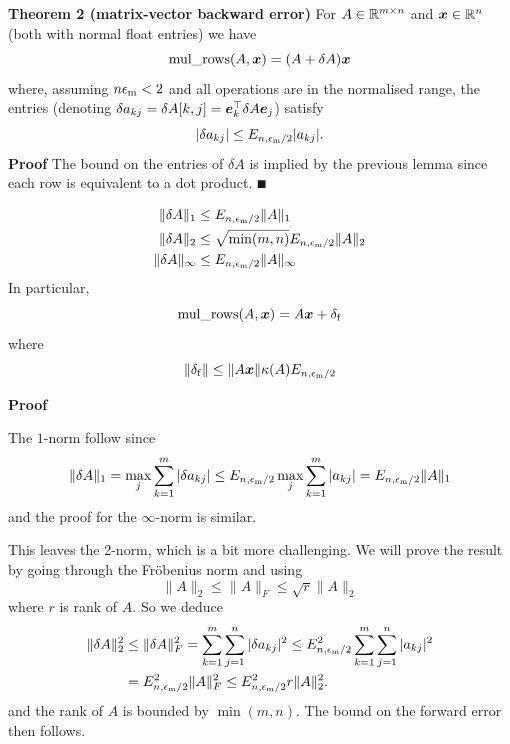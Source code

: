 \textbf{Theorem 2 (matrix-vector backward error)} For $A \in {\mathbb R}^{m \times n}$ and $\bm{{\mbox{\boldmath$x$\unboldmath}}} \in {\mathbb R}^n$ (both with normal float entries) we have
\[
\hbox{mul$\_$rows}(A, \bm{{\mbox{\boldmath$x$\unboldmath}}}) = (A + \delta A) \bm{{\mbox{\boldmath$x$\unboldmath}}}
\]
where, assuming $n \ensuremath{\epsilon}_{\rm m} < 2$ and all operations are in the normalised range, the entries (denoting $\delta a_{kj} = \delta A[k,j] = \bm{{\mbox{\boldmath$e$\unboldmath}}}_k^\top \delta A \bm{{\mbox{\boldmath$e$\unboldmath}}}_j$) satisfy
\[
|\ensuremath{\delta}a_{kj}| \ensuremath{\leq} E_{n,\ensuremath{\epsilon}_{\rm m}/2}  |a_{kj}|.
\]
\textbf{Proof} The bound on the entries of $\ensuremath{\delta}A$ is implied by the previous lemma since each row is equivalent to a dot product. \ensuremath{\QED}

\begin{corollary}[Norms]
\begin{align*}
\|\ensuremath{\delta}A\|_1 &\ensuremath{\leq} E_{n,\ensuremath{\epsilon}_{\rm m}/2} \|A \|_1 \\
\|\ensuremath{\delta}A\|_2 &\ensuremath{\leq} \sqrt{\min(m,n)} E_{n,\ensuremath{\epsilon}_{\rm m}/2} \|A \|_2 \\
\|\ensuremath{\delta}A\|_\ensuremath{\infty} &\ensuremath{\leq} E_{n,\ensuremath{\epsilon}_{\rm m}/2} \|A \|_\ensuremath{\infty}
\end{align*}
In particular, 
\[
\hbox{mul$\_$rows}(A, \bm{{\mbox{\boldmath$x$\unboldmath}}}) =A \bm{{\mbox{\boldmath$x$\unboldmath}}} + \delta_{\rm f}
\]
where
\[
\|\delta_{\rm f}\| \leq \|A \bm{{\mbox{\boldmath$x$\unboldmath}}}\| \kappa(A) E_{n,\epsilon_{\rm m}/2}
\]
\end{corollary}
\textbf{Proof}

The $1$-norm follow since
\[
\|\ensuremath{\delta}A\|_1  = \max_j \ensuremath{\sum}_{k=1}^m |\ensuremath{\delta}a_{kj}| \ensuremath{\leq}
 E_{n,\ensuremath{\epsilon}_{\rm m}/2}  \max_j \ensuremath{\sum}_{k=1}^m |a_{kj}|  = E_{n,\ensuremath{\epsilon}_{\rm m}/2} \|A\|_1
\]
and the proof for the $\ensuremath{\infty}$-norm is similar.

This leaves the 2-norm, which is a bit more challenging. We will prove the result by going through the Fröbenius norm and using
\[
\|A \|_2 \ensuremath{\leq} \|A\|_F \ensuremath{\leq} \sqrt{r} \| A\|_2
\]
where $r$ is rank of $A$. So we deduce
\begin{align*}
\|\ensuremath{\delta}A \|_2^2 &\ensuremath{\leq} \| \ensuremath{\delta}A\|_F^2 = \ensuremath{\sum}_{k=1}^m \ensuremath{\sum}_{j=1}^n |\ensuremath{\delta}a_{kj}|^2 \ensuremath{\leq}
E_{n,\ensuremath{\epsilon}_{\rm m}/2}^2 \ensuremath{\sum}_{k=1}^m \ensuremath{\sum}_{j=1}^n |a_{kj}|^2 \\
&=  E_{n,\ensuremath{\epsilon}_{\rm m}/2}^2 \|A \|_F^2 \ensuremath{\leq} E_{n,\ensuremath{\epsilon}_{\rm m}/2}^2 r \|A \|_2^2.
\end{align*}
and the rank of $A$ is bounded by $\min(m,n)$. The bound on the forward error then follows.

